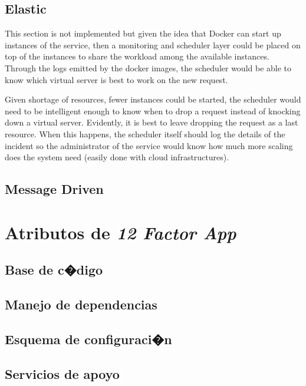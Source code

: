 \documentclass[10pt]{article}
\begin{document}
 \subsection{Elastic} %
 
This section is not implemented but given the idea that Docker can start up instances of the service, then a monitoring and scheduler layer could be placed on top of the instances to share the workload among the available instances. Through the logs emitted by the docker images, the scheduler would be able to know which virtual server is best to work on the new  request.

Given shortage of resources, fewer instances could be started, the scheduler would need to be intelligent enough to know when to drop a request instead of knocking down a virtual server. Evidently, it is best to leave dropping the request as a last resource. When this happens, the scheduler itself should log the details of the incident so the administrator of the service would know how much more scaling does the system need (easily done with cloud infrastructures).
 
 \subsection{Message Driven}
 
\section{Atributos de {\em 12 Factor App}}
 \subsection{Base de c�digo}
 \subsection{Manejo de dependencias}
 \subsection{Esquema de configuraci�n}
 \subsection{Servicios de apoyo}
\end{document}
